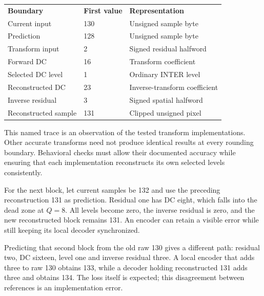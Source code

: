 \begin{center}
  \begin{tabular}{lll}
    \textbf{Boundary}    & \textbf{First value} & \textbf{Representation}       \\
    Current input        & 130                  & Unsigned sample byte          \\
    Prediction           & 128                  & Unsigned sample byte          \\
    Transform input      & 2                    & Signed residual halfword      \\
    Forward DC           & 16                   & Transform coefficient         \\
    Selected DC level    & 1                    & Ordinary INTER level          \\
    Reconstructed DC     & 23                   & Inverse-transform coefficient \\
    Inverse residual     & 3                    & Signed spatial halfword       \\
    Reconstructed sample & 131                  & Clipped unsigned pixel
  \end{tabular}
\end{center}
This named trace is an observation of the tested transform implementations.
Other accurate transforms need not produce identical results at every rounding
boundary. Behavioral checks must allow their documented accuracy while ensuring
that each implementation reconstructs its own selected levels consistently.

For the next block, let current samples be 132 and use the preceding reconstruction
131 as prediction. Residual one has DC eight, which falls into the dead zone at
$Q=8$. All levels become zero, the inverse residual is zero, and the new
reconstructed block remains 131. An encoder can retain a visible error while
still keeping its local decoder synchronized.

Predicting that second block from the old raw 130 gives a different path:
residual two, DC sixteen, level one and inverse residual three. A local encoder
that adds three to raw 130 obtains 133, while a decoder holding reconstructed
131 adds three and obtains 134. The loss itself is expected; this disagreement
between references is an implementation error.

